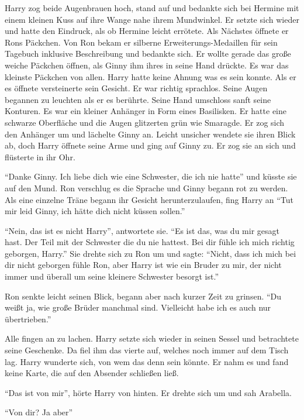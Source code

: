 Harry zog beide Augenbrauen hoch, stand auf und bedankte sich bei Hermine mit einem kleinen Kuss auf ihre Wange nahe ihrem Mundwinkel. Er setzte sich wieder und hatte den Eindruck, als ob Hermine leicht errötete. Als Nächstes öffnete er Rons Päckchen. Von Ron bekam er silberne Erweiterungs-Medaillen für sein Tagebuch inklusive Beschreibung und bedankte sich.  Er wollte gerade das große weiche Päckchen öffnen, als Ginny ihm ihres in seine Hand drückte. Es war das kleinste Päckchen von allen. Harry hatte keine Ahnung was es sein konnte. Als er es öffnete versteinerte sein Gesicht. Er war richtig sprachlos. Seine Augen begannen zu leuchten als er es berührte. Seine Hand umschloss sanft seine Konturen. Es war ein kleiner Anhänger in Form eines Basilisken. Er hatte eine schwarze Oberfläche und die Augen glitzerten grün wie Smaragde. Er zog sich den Anhänger um und lächelte Ginny an. Leicht unsicher wendete sie ihren Blick ab, doch Harry öffnete seine Arme und ging auf Ginny zu. Er zog sie an sich und flüsterte in ihr Ohr.

\enquote{Danke Ginny. Ich liebe dich \gst wie eine Schwester, die ich nie hatte} und küsste sie auf den Mund. Ron verschlug es die Sprache und Ginny begann rot zu werden. Als eine einzelne Träne begann ihr Gesicht herunterzulaufen, fing Harry an \enquote{Tut mir leid Ginny, ich hätte dich nicht küssen sollen.}

\enquote{Nein, das ist es nicht Harry}, antwortete sie. \enquote{Es ist das, was du mir gesagt hast. Der Teil mit der Schwester die du nie hattest. Bei dir fühle ich mich richtig geborgen, Harry.} Sie drehte sich zu Ron um und sagte: \enquote{Nicht, dass ich mich bei dir nicht geborgen fühle Ron, aber Harry ist wie ein Bruder zu mir, der nicht immer und überall um seine kleinere Schwester besorgt ist.}

Ron senkte leicht seinen Blick, begann aber nach kurzer Zeit zu grinsen. \enquote{Du weißt ja, wie große Brüder manchmal sind. Vielleicht habe ich es auch nur übertrieben.}

Alle fingen an zu lachen. Harry setzte sich wieder in seinen Sessel und betrachtete seine Geschenke. Da fiel ihm das vierte auf, welches noch immer auf dem Tisch lag. Harry wunderte sich, von wem das denn sein könnte. Er nahm es und fand keine Karte, die auf den Absender schließen ließ.

\enquote{Das ist von mir}, hörte Harry von hinten. Er drehte sich um und sah Arabella.

\enquote{Von dir? Ja aber\abs}

